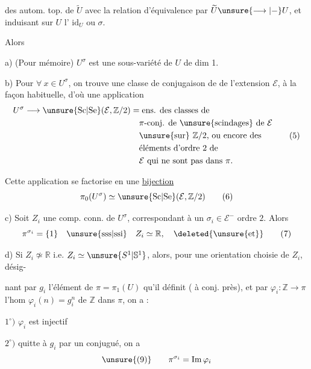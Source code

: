
des autom. top. de $\widetilde U$  avec la
relation d'équivalence  par $\widetilde U\unsure{\longrightarrow|-}U$, et
induisant sur $U$ l' $\mathrm{id}_U$ ou $\sigma$.

 Alors

a) (Pour mémoire) $U^\sigma$ est une sous-variété 
de $U$ de dim 1.

b) Pour $\forall\ x\in U^\sigma$, on trouve une classe
de \inserted{$\pi$-}conjugaison de  de l'extension
$\mathcal E$, à la façon habituelle, d'où une
application
\[
 \begin{aligned}
 U^\sigma\longrightarrow\unsure{\mathrm{Sc}|\mathrm{Se}}(\mathcal E,\mathbb Z/2)
 &=\text{ens. des classes de}\\
 &\quad\text{$\pi$-conj. de \unsure{scindages} de $\mathcal E$}\\
 &\quad\text{\unsure{sur} $\mathbb Z/2$, ou encore des}\\
 &\quad\text{éléments d'ordre $2$ de}\\
 &\quad\text{$\mathcal E$ qui ne sont pas dans $\pi$.}
 \end{aligned}
 \tag{5}
\]

Cette application se factorise en une
\uline{bijection}
\[
 \pi_0(U^\sigma)\simeq\unsure{\mathrm{Sc}|\mathrm{Se}}(\mathcal E,\mathbb Z/2)
 \tag{6}
\]

c) Soit $Z_i$ une comp. conn. de $U^\sigma$,
correspondant à un  $\sigma_i\in\mathcal E^-$ 
ordre $2$. Alors 
\[
 \pi^{\sigma_i}=\{1\}\quad\text{\unsure{sss|ssi}}\quad Z_i\simeq\mathbb R,
 \quad\deleted{\unsure{\text{et}}}
 \tag{7}
\]

d) Si $Z_i\not\simeq\mathbb R$ i.e.  $Z_i\simeq\unsure{S^1|\mathbb S^1}$, alors,
pour une orientation choisie de $Z_i$, désig-

nant par $g_i$ l'élément de $\pi=\pi_1(U)$
qu'il définit ( à conj. près), et
par $\varphi_i:\mathbb Z\longrightarrow\pi$ l'hom $\varphi_i(n)=g_i^n$ de
$\mathbb Z$ dans $\pi$, on a :

$1^\circ)$ $\varphi_i$ est injectif

$2^\circ)$ quitte à  $g_i$ par un conjugué,
on a
\[
\unsure{(9)}\qquad \pi^{\sigma_i}=\operatorname{Im}\varphi_i
\]

